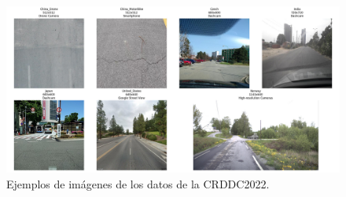 \begin{figure}
    \centering
    \includegraphics[height=\textheight,width=\textwidth,keepaspectratio]{img/example_images_regions.png}
    \caption{Ejemplos de imágenes de los datos de la CRDDC2022.}
    \label{fig:example_images_region_large}
\end{figure}